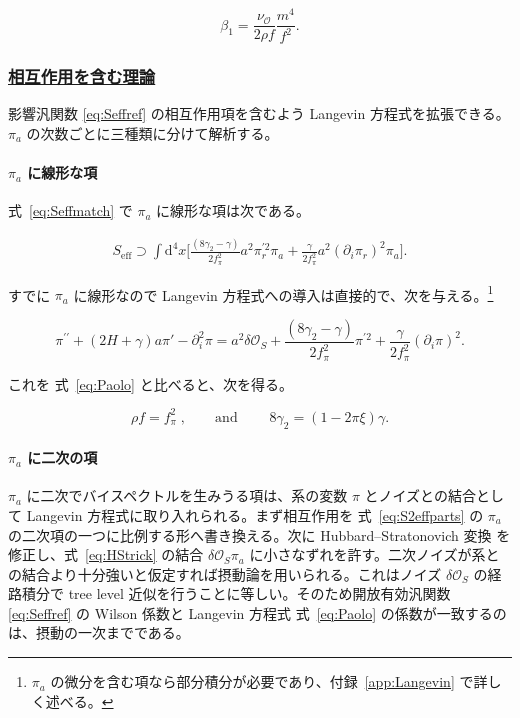 \documentclass[a4paper,11pt]{ltjsarticle}
\numberwithin{equation}{section}
\newcommand{\subsubsectionlink}[1]{\subsubsection[#1]{\hyperlink{toc}{#1}}}
\def\pia{\pi_{a}}
\def\pir{\pi_{r}}
\newcommand{\Os}{\delta \mathcal{O}_{S}}
\newcommand{\dd}{\mathrm{d}}
\newcommand{\Eq}[1]{Eq.~(\ref{#1})}
\newcommand{\App}[1]{Appendix~\ref{#1}}
\renewcommand{\Eq}[1]{式~\eqref{#1}}
\renewcommand{\App}[1]{付録~\ref{#1}}
\begin{document}
\begin{equation}
    \beta_{1}=\frac{\nu_{\mathcal{O}}}{2\rho f}\frac{m^{4}}{f^{2}}.
\end{equation}

\subsubsectionlink{相互作用を含む理論}

影響汎関数 \eqref{eq:Seffref} の相互作用項を含むよう Langevin 方程式を拡張できる。$\pia$ の次数ごとに三種類に分けて解析する。

\paragraph{$\pia$ に線形な項} \Eq{eq:Seffmatch} で $\pia$ に線形な項は次である。

\begin{align}
S_{\text{eff}} \supset  \int \dd^4 x \Big[\frac{ \left(8\gamma_2 - \gamma\right)}{2f^{2}_{\pi}}    a^2\pir^{\prime2} \pia	+ \frac{\gamma}{2f_{\pi}^{2}} a^2	\left(\partial_i \pir \right)^2 \pia\Big].
\end{align}

すでに $\pia$ に線形なので Langevin 方程式への導入は直接的で、次を与える。\footnote{$\pia$ の微分を含む項なら部分積分が必要であり、\App{app:Langevin} で詳しく述べる。}

\begin{equation}
\pi^{\prime \prime}+\left( 2H + \gamma\right)a\pi'-\partial_{i}^{2}\pi=a^2 \Os+\frac{ \left(8\gamma_2 - \gamma\right)}{2f^{2}_{\pi}}  \pi^{\prime2}+\frac{\gamma}{2f_{\pi}^{2}} 	\left(\partial_i \pi \right)^2.
\end{equation}

これを \Eq{eq:Paolo} と比べると、次を得る。

\begin{equation}
\rho f=f_{\pi}^{2}\;,\qquad \mathrm{and}\qquad \;8\gamma_2 =\left(1-2 \pi \xi\right) \gamma.
\end{equation}

\paragraph{$\pia$ に二次の項} $\pia$ に二次でバイスペクトルを生みうる項は、系の変数 $\pi$ とノイズとの結合として Langevin 方程式に取り入れられる。まず相互作用を \Eq{eq:S2effparts} の $\pia$ の二次項の一つに比例する形へ書き換える。次に Hubbard--Stratonovich 変換 \cite{Stratonovich1957,Hubbard1959} を修正し、\Eq{eq:HStrick} の結合 $\Os\pia$ に小さなずれを許す。二次ノイズが系との結合より十分強いと仮定すれば摂動論を用いられる。これはノイズ $\Os$ の経路積分で tree level 近似を行うことに等しい。そのため開放有効汎関数 \eqref{eq:Seffref} の Wilson 係数と Langevin 方程式 \Eq{eq:Paolo} の係数が一致するのは、摂動の一次までである。
\end{document}
